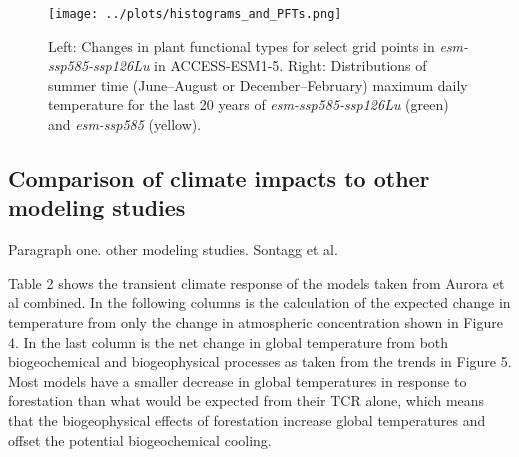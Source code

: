\documentclass[]{article}
\begin{document}
\begin{figure}[H]
    \centering
    \texttt{[image: ../plots/histograms\_and\_PFTs.png]}
    \caption{Left: Changes in plant functional types for select grid points in \textit{esm-ssp585-ssp126Lu} in ACCESS-ESM1-5. Right: Distributions of summer time (June--August or December--February) maximum daily temperature for the last 20 years of \textit{esm-ssp585-ssp126Lu} (green) and \textit{esm-ssp585} (yellow).}
    \label{fig:tasmax_distribution}
\end{figure}

\subsection{Comparison of climate impacts to other modeling studies}

Paragraph one. other modeling studies. Sontagg et al.

Table 2 shows the transient climate response of the models taken from Aurora et al combined. In the following columns is the calculation of the expected change in temperature from only the change in atmospheric concentration shown in Figure 4.
In the last column is the net change in global temperature from both biogeochemical and biogeophysical processes as taken from the trends in Figure 5.
Most models have a smaller decrease in global temperatures in response to forestation than what would be expected from their TCR alone, which means that the biogeophysical effects of forestation increase global temperatures and offset the potential biogeochemical cooling.
\end{document}
